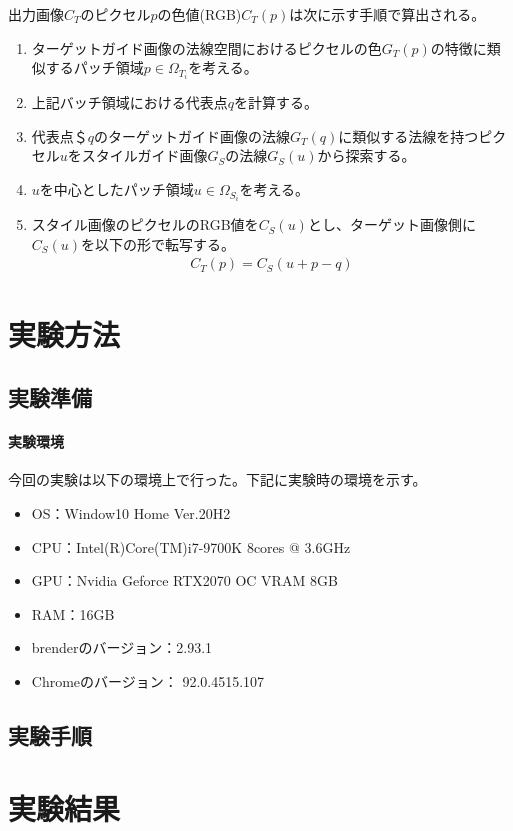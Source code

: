\documentclass[dvipdfmx]{jsarticle}
\begin{document}
出力画像$C_{T}$のピクセル$p$の色値(RGB)$C_{T}(p)$は次に示す手順で算出される。
\begin{enumerate}
  \item ターゲットガイド画像の法線空間におけるピクセルの色$G_{T}(p)$の特徴に類似するパッチ領域$p \in \Omega_{T_{i}}$を考える。
  \item 上記バッチ領域における代表点$q$を計算する。
  \item 代表点＄$q$のターゲットガイド画像の法線$G_{T}(q)$に類似する法線を持つピクセル$u$をスタイルガイド画像$G_{S}$の法線$G_{S}(u)$から探索する。
  \item $u$を中心としたパッチ領域$u \in \Omega_{S_{i}}$を考える。
  \item スタイル画像のピクセルのRGB値を$C_{S}(u)$とし、ターゲット画像側に$C_{S}(u)$を以下の形で転写する。
  \begin{gather*}
    C_{T}(p) = C_{S}(u + p -q)
  \end{gather*}
\end{enumerate}

\section{実験方法}
  \subsection{実験準備}
  \paragraph{実験環境}
    今回の実験は以下の環境上で行った。下記に実験時の環境を示す。
    \begin{itemize}
      \item OS：Window10 Home Ver.20H2
      \item CPU：Intel(R)Core(TM)i7-9700K 8cores @ 3.6GHz
      \item GPU：Nvidia Geforce RTX2070 OC VRAM 8GB
      \item RAM：16GB
      \item brenderのバージョン：2.93.1
      \item Chromeのバージョン： 92.0.4515.107
    \end{itemize}
  \subsection{実験手順}

\section{実験結果}
\end{document}
